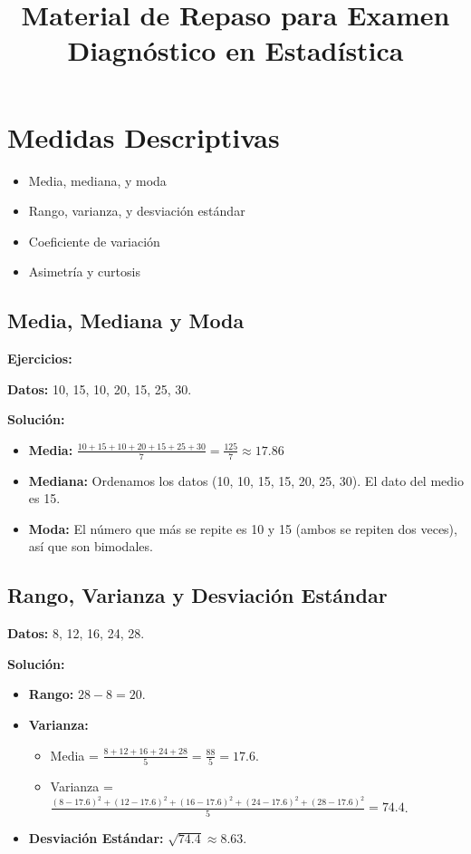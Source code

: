 \documentclass{article}
\title{Material de Repaso para Examen Diagnóstico en Estadística}
\author{}
\date{}
\begin{document}
\maketitle

\section{Medidas Descriptivas}
\begin{itemize}
    \item Media, mediana, y moda
    \item Rango, varianza, y desviación estándar
    \item Coeficiente de variación
    \item Asimetría y curtosis
\end{itemize}

\subsection{Media, Mediana y Moda}

\textbf{Ejercicios:}

\textbf{Datos:} 10, 15, 10, 20, 15, 25, 30.

\textbf{Solución:}

\begin{itemize}
    \item \textbf{Media:} $\frac{10 + 15 + 10 + 20 + 15 + 25 + 30}{7} = \frac{125}{7} \approx 17.86$
    \item \textbf{Mediana:} Ordenamos los datos (10, 10, 15, 15, 20, 25, 30). El dato del medio es 15.
    \item \textbf{Moda:} El número que más se repite es 10 y 15 (ambos se repiten dos veces), así que son bimodales.
\end{itemize}

\subsection{Rango, Varianza y Desviación Estándar}


\textbf{Datos:} 8, 12, 16, 24, 28.

\textbf{Solución:}

\begin{itemize}
    \item \textbf{Rango:} $28 - 8 = 20$.
    \item \textbf{Varianza:}
          \begin{itemize}
              \item Media = $\frac{8 + 12 + 16 + 24 + 28}{5} = \frac{88}{5} = 17.6$.
              \item Varianza = $\frac{(8 - 17.6)^2 + (12 - 17.6)^2 + (16 - 17.6)^2 + (24 - 17.6)^2 + (28 - 17.6)^2}{5} = 74.4$.
          \end{itemize}
    \item \textbf{Desviación Estándar:} $\sqrt{74.4} \approx 8.63$.
\end{itemize}
\end{document}
